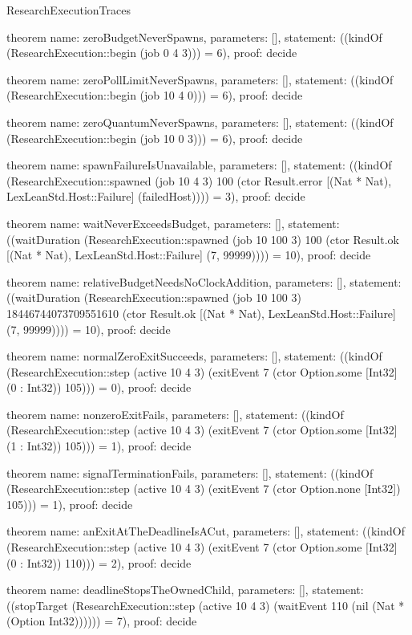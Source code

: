 \begin{lexlean}{ResearchExecutionTraces}
\begin{semanticmodule}
theorem{
  name: zeroBudgetNeverSpawns,
  parameters: [],
  statement: ((kindOf (ResearchExecution::begin (job 0 4 3))) = 6),
  proof: decide{}
}

theorem{
  name: zeroPollLimitNeverSpawns,
  parameters: [],
  statement: ((kindOf (ResearchExecution::begin (job 10 4 0))) = 6),
  proof: decide{}
}

theorem{
  name: zeroQuantumNeverSpawns,
  parameters: [],
  statement: ((kindOf (ResearchExecution::begin (job 10 0 3))) = 6),
  proof: decide{}
}

theorem{
  name: spawnFailureIsUnavailable,
  parameters: [],
  statement: ((kindOf (ResearchExecution::spawned (job 10 4 3) 100 (ctor Result.error [(Nat * Nat), LexLeanStd.Host::Failure] (failedHost)))) = 3),
  proof: decide{}
}

theorem{
  name: waitNeverExceedsBudget,
  parameters: [],
  statement: ((waitDuration (ResearchExecution::spawned (job 10 100 3) 100 (ctor Result.ok [(Nat * Nat), LexLeanStd.Host::Failure] (7, 99999)))) = 10),
  proof: decide{}
}

theorem{
  name: relativeBudgetNeedsNoClockAddition,
  parameters: [],
  statement: ((waitDuration (ResearchExecution::spawned (job 10 100 3) 18446744073709551610 (ctor Result.ok [(Nat * Nat), LexLeanStd.Host::Failure] (7, 99999)))) = 10),
  proof: decide{}
}

theorem{
  name: normalZeroExitSucceeds,
  parameters: [],
  statement: ((kindOf (ResearchExecution::step (active 10 4 3) (exitEvent 7 (ctor Option.some [Int32] (0 : Int32)) 105))) = 0),
  proof: decide{}
}

theorem{
  name: nonzeroExitFails,
  parameters: [],
  statement: ((kindOf (ResearchExecution::step (active 10 4 3) (exitEvent 7 (ctor Option.some [Int32] (1 : Int32)) 105))) = 1),
  proof: decide{}
}

theorem{
  name: signalTerminationFails,
  parameters: [],
  statement: ((kindOf (ResearchExecution::step (active 10 4 3) (exitEvent 7 (ctor Option.none [Int32]) 105))) = 1),
  proof: decide{}
}

theorem{
  name: anExitAtTheDeadlineIsACut,
  parameters: [],
  statement: ((kindOf (ResearchExecution::step (active 10 4 3) (exitEvent 7 (ctor Option.some [Int32] (0 : Int32)) 110))) = 2),
  proof: decide{}
}

theorem{
  name: deadlineStopsTheOwnedChild,
  parameters: [],
  statement: ((stopTarget (ResearchExecution::step (active 10 4 3) (waitEvent 110 (nil (Nat * (Option Int32)))))) = 7),
  proof: decide{}
}


\end{semanticmodule}
\end{lexlean}
